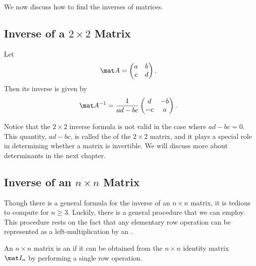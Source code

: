 We now discuss how to find the inverses of matrices.

\subsection{Inverse of a \texorpdfstring{$2 \times 2$}{2 x 2} Matrix}

\begin{proposition}
    Let \[\mat A = \begin{pmatrix}a & b \\ c & d\end{pmatrix}.\] Then its inverse is given by \[\mat A^{-1} = \frac1{ad - bc} \begin{pmatrix}d & - b \\ -c & a\end{pmatrix}.\]
\end{proposition}

Notice that the $2 \times 2$ inverse formula is not valid in the case where $ad - bc = 0$. This quantity, $ad - bc$, is called the  of the $2 \times 2$ matrix, and it plays a special role in determining whether a matrix is invertible. We will discuss more about determinants in the next chapter.

\subsection{Inverse of an \texorpdfstring{$n \times n$}{n x n} Matrix}

Though there is a general formula for the inverse of an $n \times n$ matrix, it is tedious to compute for $n \geq 3$. Luckily, there is a general procedure that we can employ. This procedure rests on the fact that any elementary row operation can be represented as a left-multiplication by an .

\begin{definition}
    An $n \times n$ matrix is an  if it can be obtained from the $n \times n$ identity matrix $\mat I_n$ by performing a single row operation.
\end{definition}


